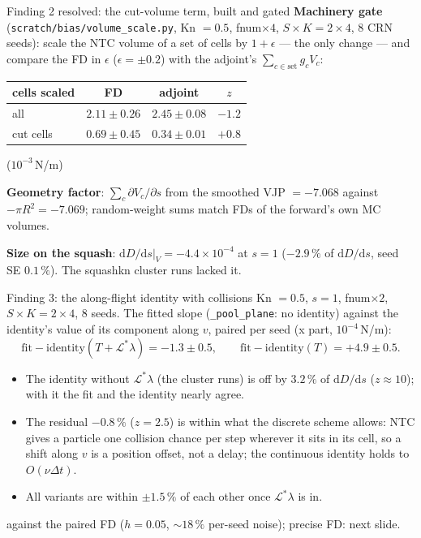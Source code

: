 \documentclass[10pt,aspectratio=169]{beamer}
\newcommand{\dd}{\mathrm{d}}
\newcommand{\code}[1]{\texttt{\small #1}}
\begin{document}
\begin{frame}{Finding 2 resolved: the cut-volume term, built and gated}
\textbf{Machinery gate} (\code{scratch/bias/volume\_scale.py}, Kn $=0.5$, fnum$\times4$, $S\times
K = 2\times4$, 8 CRN seeds): scale the NTC volume of a set of cells by $1+\epsilon$ --- the only
change --- and compare the FD in $\epsilon$ ($\epsilon = \pm0.2$) with the adjoint's
$\sum_{c\in\text{set}} g_c V_c$:

\medskip
\centering\small
\begin{tabular}{@{}lccc@{}}
\toprule
cells scaled & FD & adjoint & $z$\\
\midrule
all & $2.11\pm0.26$ & $2.45\pm0.08$ & $-1.2$\\
cut cells & $0.69\pm0.45$ & $0.34\pm0.01$ & $+0.8$\\
\bottomrule
\end{tabular}
\quad ($10^{-3}$\,N/m)

\raggedright
\medskip
\textbf{Geometry factor}: $\sum_c \partial V_c/\partial s$ from the smoothed VJP $=-7.068$
against $-\pi R^2 = -7.069$; random-weight sums match FDs of the forward's own MC volumes.

\medskip
\textbf{Size on the squash}: $\dd D/\dd s|_V = -4.4\times10^{-4}$ at $s = 1$ ($-2.9\,\%$ of
$\dd D/\dd s$, seed SE $0.1\,\%$).  The squashkn cluster runs lacked it.
\end{frame}

\begin{frame}{Finding 3: the along-flight identity with collisions}
Kn $=0.5$, $s = 1$, fnum$\times2$, $S\times K = 2\times4$, 8 seeds.  The fitted slope
(\code{*\_pool\_plane}: no identity) against the identity's value of its component along $v$,
paired per seed (x part, $10^{-4}$\,N/m):
\[
\text{fit} - \text{identity}(T + \mathcal L^*\lambda) = -1.3\pm0.5,\qquad
\text{fit} - \text{identity}(T) = +4.9\pm0.5 .
\]
\begin{itemize}
\item The identity without $\mathcal L^*\lambda$ (the cluster runs) is off by
  $3.2\,\%$ of $\dd D/\dd s$ ($z\approx10$); with it the fit and the identity nearly agree.
\item The residual $-0.8\,\%$ ($z = 2.5$) is within what the discrete scheme allows: NTC gives a
  particle one collision chance per step wherever it sits in its cell, so a shift along $v$ is
  a position offset, not a delay; the continuous identity holds to $O(\nu\Delta t)$.
\item All variants are within $\pm1.5\,\%$ of each other once $\mathcal L^*\lambda$ is in.
\end{itemize}
\scriptsize

\quad against the paired FD ($h = 0.05$, $\sim18\,\%$ per-seed noise); precise FD: next slide.
\end{frame}
\end{document}
